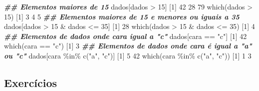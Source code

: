 \documentclass[
  10pt,
  a4paper]{book}
\newenvironment{Shaded}{\begin{snugshade}}{\end{snugshade}}
\newcommand{\DecValTok}[1]{\textcolor[rgb]{0.00,0.00,0.81}{#1}}
\newcommand{\DocumentationTok}[1]{\textcolor[rgb]{0.56,0.35,0.01}{\textbf{\textit{#1}}}}
\newcommand{\FunctionTok}[1]{\textcolor[rgb]{0.00,0.00,0.00}{#1}}
\newcommand{\NormalTok}[1]{#1}
\newcommand{\SpecialCharTok}[1]{\textcolor[rgb]{0.00,0.00,0.00}{#1}}
\newcommand{\StringTok}[1]{\textcolor[rgb]{0.31,0.60,0.02}{#1}}
\begin{document}
\begin{Shaded}
\begin{Highlighting}[]
\DocumentationTok{\#\# Elementos maiores de 15}
\NormalTok{dados[dados }\SpecialCharTok{\textgreater{}} \DecValTok{15}\NormalTok{]}
\NormalTok{[}\DecValTok{1}\NormalTok{] }\DecValTok{42} \DecValTok{28} \DecValTok{79}
\FunctionTok{which}\NormalTok{(dados }\SpecialCharTok{\textgreater{}} \DecValTok{15}\NormalTok{)}
\NormalTok{[}\DecValTok{1}\NormalTok{] }\DecValTok{3} \DecValTok{4} \DecValTok{5}
\DocumentationTok{\#\# Elementos maiores de 15 e menores ou iguais a 35}
\NormalTok{dados[dados }\SpecialCharTok{\textgreater{}} \DecValTok{15} \SpecialCharTok{\&}\NormalTok{ dados }\SpecialCharTok{\textless{}=} \DecValTok{35}\NormalTok{]}
\NormalTok{[}\DecValTok{1}\NormalTok{] }\DecValTok{28}
\FunctionTok{which}\NormalTok{(dados }\SpecialCharTok{\textgreater{}} \DecValTok{15} \SpecialCharTok{\&}\NormalTok{ dados }\SpecialCharTok{\textless{}=} \DecValTok{35}\NormalTok{)}
\NormalTok{[}\DecValTok{1}\NormalTok{] }\DecValTok{4}
\DocumentationTok{\#\# Elementos de dados onde cara igual a "c"}
\NormalTok{dados[cara }\SpecialCharTok{==} \StringTok{"c"}\NormalTok{]}
\NormalTok{[}\DecValTok{1}\NormalTok{] }\DecValTok{42}
\FunctionTok{which}\NormalTok{(cara }\SpecialCharTok{==} \StringTok{"c"}\NormalTok{)}
\NormalTok{[}\DecValTok{1}\NormalTok{] }\DecValTok{3}
\DocumentationTok{\#\# Elementos de dados onde cara é igual a "a" ou "c"}
\NormalTok{dados[cara }\SpecialCharTok{\%in\%} \FunctionTok{c}\NormalTok{(}\StringTok{"a"}\NormalTok{, }\StringTok{"c"}\NormalTok{)]}
\NormalTok{[}\DecValTok{1}\NormalTok{]  }\DecValTok{5} \DecValTok{42}
\FunctionTok{which}\NormalTok{(cara }\SpecialCharTok{\%in\%} \FunctionTok{c}\NormalTok{(}\StringTok{"a"}\NormalTok{, }\StringTok{"c"}\NormalTok{))}
\NormalTok{[}\DecValTok{1}\NormalTok{] }\DecValTok{1} \DecValTok{3}
\end{Highlighting}
\end{Shaded}

\hypertarget{exercuxedcios-7}{%
\subsection*{Exercícios}\label{exercuxedcios-7}}
\end{document}
